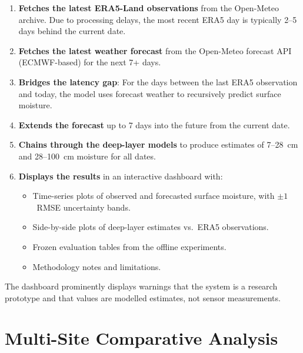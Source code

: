 \documentclass[12pt, a4paper]{article}
\begin{document}
\begin{enumerate}
    \item \textbf{Fetches the latest ERA5-Land observations} from the Open-Meteo archive. Due to processing delays, the most recent ERA5 day is typically 2--5 days behind the current date.
    
    \item \textbf{Fetches the latest weather forecast} from the Open-Meteo forecast API (ECMWF-based) for the next 7+ days.
    
    \item \textbf{Bridges the latency gap}: For the days between the last ERA5 observation and today, the model uses forecast weather to recursively predict surface moisture.
    
    \item \textbf{Extends the forecast} up to 7 days into the future from the current date.
    
    \item \textbf{Chains through the deep-layer models} to produce estimates of 7--28~cm and 28--100~cm moisture for all dates.
    
    \item \textbf{Displays the results} in an interactive dashboard with:
    \begin{itemize}
        \item Time-series plots of observed and forecasted surface moisture, with $\pm 1$~RMSE uncertainty bands.
        \item Side-by-side plots of deep-layer estimates vs.\ ERA5 observations.
        \item Frozen evaluation tables from the offline experiments.
        \item Methodology notes and limitations.
    \end{itemize}
\end{enumerate}

The dashboard prominently displays warnings that the system is a research prototype and that values are modelled estimates, not sensor measurements.


\section{Multi-Site Comparative Analysis}
\end{document}
